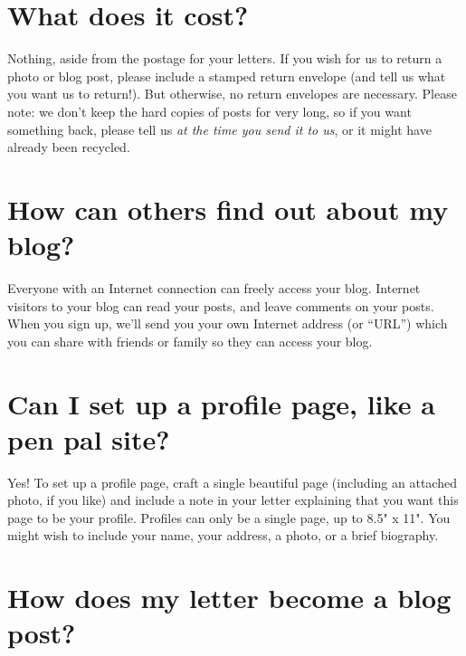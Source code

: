 \documentclass[12pt]{article}
\begin{document}
{{{{{{{{{%
\section*{What does it cost?}
Nothing, aside from the postage for your letters.  If you wish for us to return a photo or blog post, please include a stamped return envelope (and tell us what you want us to return!).  But otherwise, no return envelopes are necessary.  Please note: we don't keep the hard copies of posts for very long, so if you want something back, please tell us \emph{at the time you send it to us}, or it might have already been recycled.
{%

{%
\section*{How can others find out about my blog?}
Everyone with an Internet connection can freely access your blog.  Internet visitors to your blog can read your posts, and leave comments on your posts.  When you sign up, we'll send you your own Internet address (or ``URL'') which you can share with friends or family so they can access your blog.
{%

\begin{wrapfigure}[5]{R}{1.5in}
\vspace{-30pt}
\texttt{[image: \% templatetag openbrace \%]}{{MEDIA_ROOT}}/intro/profile}
\vspace{-40pt}
\end{wrapfigure}

{%
\section*{Can I set up a profile page, like a pen pal site?}
Yes! To set up a profile page, craft a single beautiful page (including an attached photo, if you like) and include a note in your letter explaining that you want this page to be your profile.  Profiles can only be a single page, up to 8.5" x 11".  You might wish to include your name, your address, a photo, or a brief biography.
{%

{%
\section*{How does my letter become a blog post?}
{%

\begin{wrapfigure}{L}{1.5in}
\vspace{-20pt}
\texttt{[image: \% templatetag openbrace \%]}{{MEDIA_ROOT}}/intro/scanning}
\vspace{-50pt}
\end{wrapfigure}

}}}}}}}}}}}}}}}}
\end{document}
